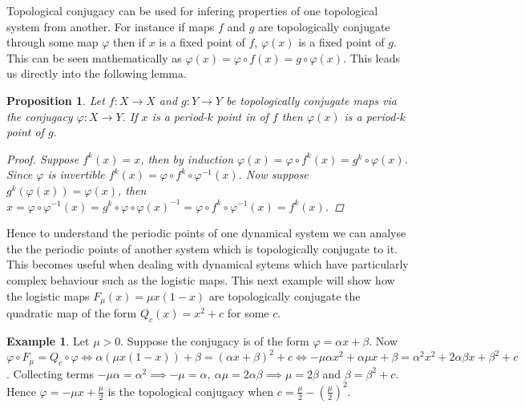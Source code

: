 \documentclass[11pt,a4paper,oneside]{memoir}
\theoremstyle{plain}
\newtheorem{prop}[thm]{Proposition}
\theoremstyle{definition}
\newtheorem{exmp}[thm]{Example}
\begin{document}
\begin{center}
\end{center}

Topological conjugacy can be used for infering properties of one topological system from another. For instance if maps $f$ and $g$ are topologically conjugate through some map $\varphi$ then if $x$ is a fixed point of $f$, $\varphi(x)$ is a fixed point of $g$. This can be seen mathematically as $\varphi(x) = \varphi \circ f(x) = g \circ \varphi(x)$. This leads us directly into the following lemma.

\begin{prop}
    Let $f: X \to X$ and $g: Y \to Y$ be topologically conjugate maps via the conjugacy $\varphi: X \to Y$. If $x$ is a period-$k$ point in of $f$ then $\varphi(x)$ is a period-$k$ point of $g$.
    \begin{proof}
        Suppose $f^k(x) = x$, then by induction $\varphi(x) = \varphi \circ f^k(x) = g^k \circ \varphi (x)$. Since $\varphi$ is invertible $f^k(x) = \varphi \circ f^k \circ \varphi^{-1}(x)$. Now suppose $g^k(\varphi(x)) = \varphi(x)$, then $x = \varphi \circ \varphi^{-1}(x) = g^k \circ \varphi \circ \varphi(x)^{-1} = \varphi \circ f^k \circ \varphi^{-1}(x) = f^k(x)$.
    \end{proof}
\end{prop}

Hence to understand the periodic points of one dynamical system we can analyse the the periodic points of another system which is topologically conjugate to it. This becomes useful when dealing with dynamical sytems which have particularly complex behaviour such as the logistic maps. This next example will show how the logistic maps $F_\mu(x) = \mu x(1-x)$ are topologically conjugate the quadratic map of the form $Q_c(x) = x^2 + c$ for some $c$.

\begin{exmp} \label{exmp:logisticquadratic}
    Let $\mu > 0$. Suppose the conjugacy is of the form $\varphi = \alpha x + \beta$. Now $\varphi \circ F_\mu = Q_c \circ \varphi \iff \alpha(\mu x(1-x)) + \beta = (\alpha x + \beta)^2 + c \iff -\mu \alpha x^2 + \alpha \mu x + \beta = \alpha ^ 2 x^2 + 2\alpha\beta x+ \beta ^ 2 + c$. Collecting terms $-\mu \alpha = \alpha ^ 2 \implies -\mu = \alpha, \ \alpha\mu = 2\alpha\beta \implies \mu = 2\beta$ and $\beta = \beta^2 + c$. Hence $\varphi = -\mu x + \frac{\mu}{2}$ is the topological conjugacy when $c = \frac{\mu}{2} - (\frac{\mu}{2})^2$.
\end{exmp}
\end{document}
